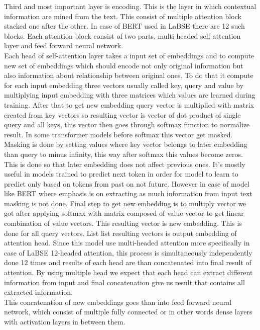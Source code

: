 Third and most important layer is encoding. This is the layer in which contextual information are mined from the text. This consist of multiple attention block stacked one after the other. In case of BERT used in LaBSE there are 12 such blocks. Each attention block consist of two parts, multi-headed self-attention layer and feed forward neural network. 
\\

Each head of self-attention layer takes a input set of embeddings and to compute new set of embeddings which should encode not only original information but also information about relationship between original ones. To do that it compute for each input embedding three vectors usually called key, query and value by multiplying input embedding with three matrices which values are learned during training. After that to get new embedding query vector is multiplied with matrix created from key vectors so resulting vector is vector of dot product of single query and all keys, this vector then goes through softmax function to normalize result. In some transformer models before softmax this vector get masked. Masking is done by setting values where key vector belongs to later embedding than query to minus infinity, this way after softmax this values become zeros. This is done so that later embedding does not affect previous ones. It's mostly useful in models trained to predict next token in order for model to learn to predict only based on tokens from past on not future. However in case of model like BERT where emphasis is on extracting as much information from input text masking is not done. Final step to get new embedding is to multiply vector we got after applying softmax with matrix composed of value vector to get linear combination of value vectors. This resulting vector is new embedding. This is done for all query vectors. List list resulting vectors is output embedding of attention head. Since this model use multi-headed attention more specifically in case of LaBSE 12-headed attention, this process is simultaneously independently done 12 times and results of each head are than concatenated into final result of attention. By using multiple head we expect that each head can extract different information from input and final concatenation give us result that contains all extracted information.    
\\

This concatenation of new embeddings goes than into feed forward neural network, which consist of multiple fully connected or in other words dense layers with activation layers in between them.
\\

